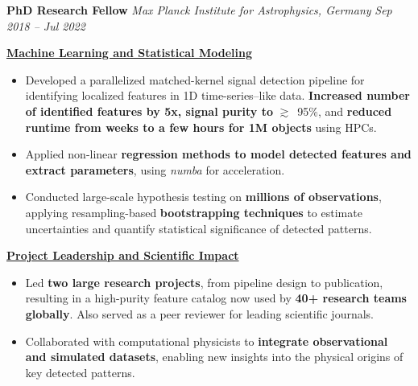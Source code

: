\documentclass[a4paper,10pt]{article}
\begin{document}
\vspace{2mm}
\textcolor{sectionblue}{\textbf{PhD Research Fellow}} \hfill 
\textcolor{sectionblue}{\textit{Max Planck Institute for Astrophysics, Germany}} \hfill 
\textcolor{sectionblue}{\textit{Sep 2018 – Jul 2022}}

\vspace{2mm}
\begin{adjustwidth}{1em}{0pt}

\textcolor{sectionblue}{\textbf{\underline{Machine Learning and Statistical Modeling}}}
\begin{itemize}[leftmargin=*, itemsep=2pt]
    \item Developed a parallelized matched-kernel signal detection pipeline for identifying localized features in 1D time-series–like data. \textbf{Increased number of identified features by 5x, signal purity to} $\gtrsim$~95\%, and \textbf{reduced runtime from weeks to a few hours for 1M objects} using HPCs.
     \vspace{-0.5mm}
    \item Applied non-linear \textbf{regression methods to model detected features and extract parameters}, using \textit{numba} for acceleration.
     \vspace{-0.5mm}
    \item Conducted large-scale hypothesis testing on \textbf{millions of observations}, applying resampling-based \textbf{bootstrapping techniques} to estimate uncertainties and quantify statistical significance of detected patterns.
\end{itemize}

\vspace{2pt}
\textcolor{sectionblue}{\textbf{\underline{Project Leadership and Scientific Impact}}}
\begin{itemize}[leftmargin=*, itemsep=2pt]
   \item Led \textbf{two large research projects}, from pipeline design to publication, resulting in a high-purity feature catalog now used by \textbf{40+ research teams globally}. Also served as a peer reviewer for leading scientific journals.
    \vspace{-0.5mm}
    \item Collaborated with computational physicists to \textbf{integrate observational and simulated datasets}, enabling new insights into the physical origins of key detected patterns.
\end{itemize}
\end{adjustwidth}
\vspace*{-4.5mm}
\end{document}
